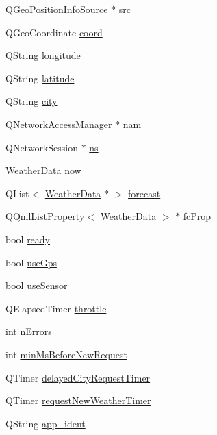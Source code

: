 \begin{DoxyCompactItemize}
\item 
Q\+Geo\+Position\+Info\+Source $\ast$ \hyperlink{class_app_model_private_a6f5f4021a335ff82b19cc9c5ed4d19a7}{src}
\item 
Q\+Geo\+Coordinate \hyperlink{class_app_model_private_a6ce8f938ce4197f9a2d1a5fdf90687d7}{coord}
\item 
Q\+String \hyperlink{class_app_model_private_a369e6197bd552c528a947c6e3ad3000e}{longitude}
\item 
Q\+String \hyperlink{class_app_model_private_a452f47a16e99adf64227449878d289a8}{latitude}
\item 
Q\+String \hyperlink{class_app_model_private_a9a1ea4d9c7b777128bb9180c0cb460a2}{city}
\item 
Q\+Network\+Access\+Manager $\ast$ \hyperlink{class_app_model_private_a1f605297f1e16880a2dd0ccbc7b8119f}{nam}
\item 
Q\+Network\+Session $\ast$ \hyperlink{class_app_model_private_a85e7bb4817c205ee9abb8fc03af9e7ef}{ns}
\item 
\hyperlink{class_weather_data}{Weather\+Data} \hyperlink{class_app_model_private_adacce6c96a2a7b0b825586a63a15bcac}{now}
\item 
Q\+List$<$ \hyperlink{class_weather_data}{Weather\+Data} $\ast$ $>$ \hyperlink{class_app_model_private_a4a0ab8ebb3742361ce643075cdb1baac}{forecast}
\item 
Q\+Qml\+List\+Property$<$ \hyperlink{class_weather_data}{Weather\+Data} $>$ $\ast$ \hyperlink{class_app_model_private_a2de18f475201900df044dffb35c64347}{fc\+Prop}
\item 
bool \hyperlink{class_app_model_private_ab0434f387adadf9ed65183496fe80f77}{ready}
\item 
bool \hyperlink{class_app_model_private_a7cb7a05c8aa13c53f2089c9d1859fa9c}{use\+Gps}
\item 
bool \hyperlink{class_app_model_private_a374b10db8a3d40b56cf11bca2a2e3406}{use\+Sensor}
\item 
Q\+Elapsed\+Timer \hyperlink{class_app_model_private_af7465b76b5114594317cfe0528911ccf}{throttle}
\item 
int \hyperlink{class_app_model_private_aca2424002aea4928103c0af419b0152f}{n\+Errors}
\item 
int \hyperlink{class_app_model_private_a94421ad102edc6fdac2187201fcc3511}{min\+Ms\+Before\+New\+Request}
\item 
Q\+Timer \hyperlink{class_app_model_private_aa42651b04c201eaa24ef5c86a67f4b42}{delayed\+City\+Request\+Timer}
\item 
Q\+Timer \hyperlink{class_app_model_private_ad073c8bcf6739fd658009860e12aa72c}{request\+New\+Weather\+Timer}
\item 
Q\+String \hyperlink{class_app_model_private_a5441fbeeb55ca91647be56e38105d690}{app\+\_\+ident}
\end{DoxyCompactItemize}
